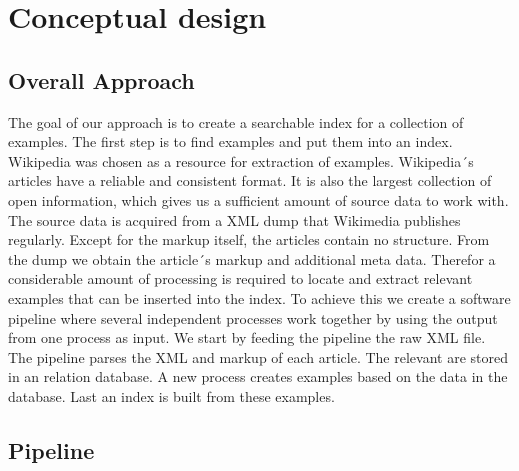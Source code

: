 
\chapter{Conceptual design}\label{cap_3}



\section{Overall Approach}

The goal of our approach is to create a searchable index for a collection of examples. The first step is to find examples and put them into an index. Wikipedia was chosen as a resource for extraction of examples. Wikipedia´s articles have a reliable and consistent format. It is also the largest collection of open information, which gives us a sufficient amount of source data to work with. The source data is acquired from a XML dump that Wikimedia publishes regularly. Except for the markup itself, the articles contain no structure. From the dump we obtain the article´s markup and additional meta data. Therefor a considerable amount of processing is required to locate and extract relevant examples that can be inserted into the index. To achieve this we create a software pipeline where several independent processes work together by using the output from one process as input. We start by feeding the pipeline the raw XML file. The pipeline parses the XML and markup of each article. The relevant are stored in an relation database. A new process creates examples based on the data in the database. Last an index is built from these examples.

\section{Pipeline} \label{cd_pipeline}

